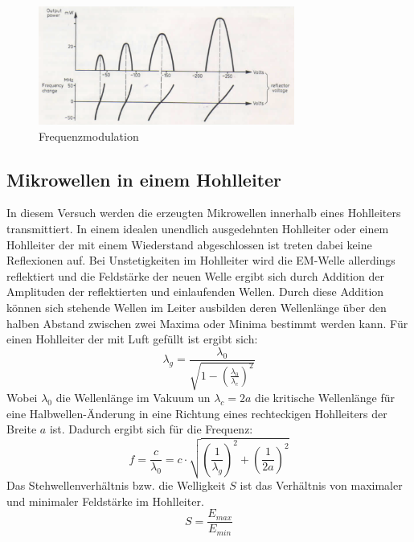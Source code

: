         \begin{figure}
            \centering
            \includegraphics[width = 0.75\textwidth]{bilder/Frequenzmodulation.png}
            \caption{Frequenzmodulation}
            \label{fig:frequenzmodulation}
        \end{figure}
    \subsection{Mikrowellen in einem Hohlleiter}
    \label{sec:Hohlleiter}
        In diesem Versuch werden die erzeugten Mikrowellen innerhalb eines Hohlleiters transmittiert.
        In einem idealen unendlich ausgedehnten Hohlleiter oder einem Hohlleiter der mit einem Wiederstand abgeschlossen ist treten dabei keine Reflexionen auf.
        Bei Unstetigkeiten im Hohlleiter wird die EM-Welle allerdings reflektiert und die Feldstärke der neuen Welle ergibt sich durch Addition der Amplituden der reflektierten und einlaufenden Wellen.
        Durch diese Addition können sich stehende Wellen im Leiter ausbilden deren Wellenlänge über den halben Abstand zwischen zwei Maxima oder Minima bestimmt werden kann.
        Für einen Hohlleiter der mit Luft gefüllt ist ergibt sich:
        \begin{equation}
            \lambda_g = \frac{\lambda_0}{\sqrt{1-\left(\frac{\lambda_0}{\lambda_c}\right)^2}}
        \end{equation}
        Wobei $\lambda_0$ die Wellenlänge im Vakuum un $\lambda_c = 2a$ die kritische Wellenlänge für eine Halbwellen-Änderung in eine Richtung eines rechteckigen Hohlleiters der Breite $a$ ist.
        Dadurch ergibt sich für die Frequenz:
        \begin{equation}
            \label{eqn:frequenz}
            f = \frac{c}{\lambda_0} = c \cdot \sqrt{\left(\frac{1}{\lambda_g}\right)^2 + \left(\frac{1}{2a}\right)^2}
        \end{equation}
        Das Stehwellenverhältnis bzw. die Welligkeit $S$ ist das Verhältnis von maximaler und minimaler Feldstärke im Hohlleiter.
        \begin{equation}
            S = \frac{E_{max}}{E_{min}}
        \end{equation}
